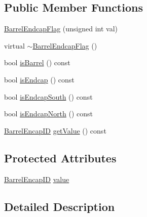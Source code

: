 \subsection*{Public Member Functions}
\begin{DoxyCompactItemize}
\item 
\hyperlink{class_d_d4hep_1_1_d_d_rec_1_1_i_d_decoder_1_1_barrel_endcap_flag_acecd6351bd9d45414c9689c222eb719b}{Barrel\+Endcap\+Flag} (unsigned int val)
\item 
virtual \hyperlink{class_d_d4hep_1_1_d_d_rec_1_1_i_d_decoder_1_1_barrel_endcap_flag_a49909f06796881e12c94f8a545f19e28}{$\sim$\+Barrel\+Endcap\+Flag} ()
\item 
bool \hyperlink{class_d_d4hep_1_1_d_d_rec_1_1_i_d_decoder_1_1_barrel_endcap_flag_a921c03e4bba6fc0bbbf6eb80a1216746}{is\+Barrel} () const
\item 
bool \hyperlink{class_d_d4hep_1_1_d_d_rec_1_1_i_d_decoder_1_1_barrel_endcap_flag_a4030f88c4a1f681cf9a21e5591fa5de3}{is\+Endcap} () const
\item 
bool \hyperlink{class_d_d4hep_1_1_d_d_rec_1_1_i_d_decoder_1_1_barrel_endcap_flag_afe87905ea8427036bd87cd1a1b544fd4}{is\+Endcap\+South} () const
\item 
bool \hyperlink{class_d_d4hep_1_1_d_d_rec_1_1_i_d_decoder_1_1_barrel_endcap_flag_a83bbd01758f59d4adfdcf3d65af33992}{is\+Endcap\+North} () const
\item 
\hyperlink{class_d_d4hep_1_1_d_d_rec_1_1_i_d_decoder_1_1_barrel_endcap_flag_acbdae4d36c49605ada531eddce7b60d8}{Barrel\+Encap\+ID} \hyperlink{class_d_d4hep_1_1_d_d_rec_1_1_i_d_decoder_1_1_barrel_endcap_flag_a47ba8b3abe179806cc641103b42b19c4}{get\+Value} () const
\end{DoxyCompactItemize}
\subsection*{Protected Attributes}
\begin{DoxyCompactItemize}
\item 
\hyperlink{class_d_d4hep_1_1_d_d_rec_1_1_i_d_decoder_1_1_barrel_endcap_flag_acbdae4d36c49605ada531eddce7b60d8}{Barrel\+Encap\+ID} \hyperlink{class_d_d4hep_1_1_d_d_rec_1_1_i_d_decoder_1_1_barrel_endcap_flag_a7521612ff515aea981e4136b33d7b06e}{value}
\end{DoxyCompactItemize}


\subsection{Detailed Description}


